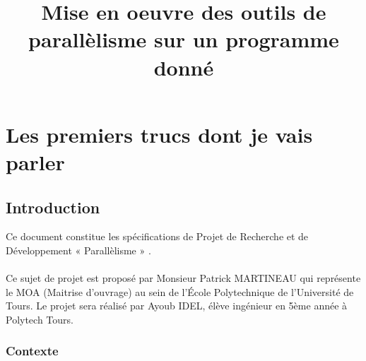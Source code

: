 \documentclass{polytech/polytech}
\title{Mise en oeuvre des outils de parallèlisme sur un programme donné}
\begin{document}
    
    \part{Les premiers trucs dont je vais parler}                
    
    \chapter{Introduction}   
    Ce document constitue les spécifications de Projet de Recherche et de Développement  « Parallèlisme » .\\\\
    Ce sujet de projet est proposé par Monsieur Patrick MARTINEAU qui représente le MOA (Maitrise d'ouvrage) au sein de l’École Polytechnique de l’Université de Tours. Le projet sera réalisé par Ayoub IDEL, élève ingénieur en 5ème année à Polytech Tours.
    
        \section{Contexte}
        
\end{document}
